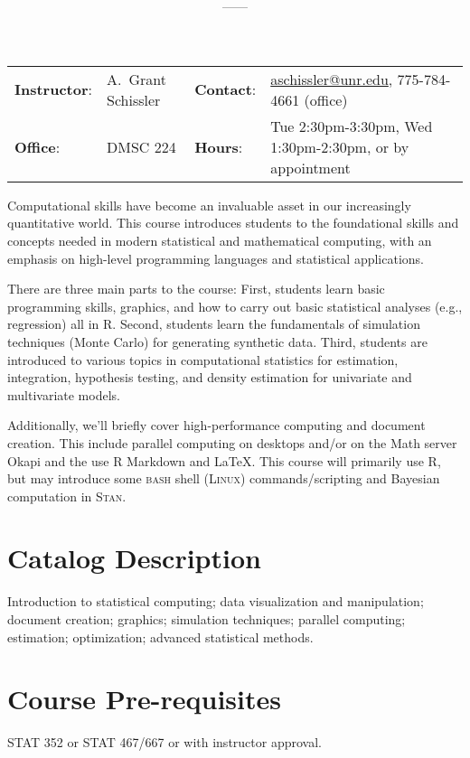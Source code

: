 \documentclass[11pt,onecolumn]{article}
\title{\textbf{\coursename}}
\author{{\semester}---{\roomnumb}---{\classtimes}}
\date{}
\makeatletter
\newcommand{\myname}{A.~Grant Schissler}
\newcommand{\myemail}{aschissler@unr.edu}
\newcommand{\office}{DMSC 224}
\newcommand{\officehours}{Tue 2:30pm-3:30pm, Wed 1:30pm-2:30pm, or by appointment}
\makeatother
\begin{document}
\maketitle

\vspace{-0.25in}
\noindent\makebox[\linewidth]{\rule{\textwidth}{1pt}}

\begin{center}
\begin{tabular}{llll}
\textbf{Instructor}:&\myname & \textbf{Contact}:&\href{mailto:\myemail}{\myemail}, 775-784-4661 (office)\\
\textbf{Office}:&\office & \textbf{Hours}:&\officehours\\
\end{tabular}
\end{center}

Computational skills have become an invaluable asset in our increasingly quantitative world. This course introduces students to the foundational skills and concepts needed in modern statistical and mathematical computing, with an emphasis on high-level programming languages and statistical applications. 

There are three main parts to the course: First, students learn basic programming skills, graphics, and how to carry out basic statistical analyses (e.g., regression) all in \textsc{R}. Second, students learn the fundamentals of simulation techniques (Monte Carlo) for generating synthetic data. Third, students are introduced to various topics in computational statistics for estimation, integration, hypothesis testing, and density estimation for univariate and multivariate models.

Additionally, we'll briefly cover high-performance computing and document creation. This include parallel computing on desktops and/or on the Math server Okapi and the use \textsc{R} Markdown and \LaTeX. This course will primarily use \textsc{R}, but may introduce some \textsc{bash} shell (\textsc{Linux}) commands/scripting and Bayesian computation in \textsc{Stan}.

\section*{Catalog Description}
Introduction to statistical computing; data visualization and manipulation; document creation; graphics; simulation techniques; parallel computing; estimation; optimization; advanced statistical methods.

\section*{Course Pre-requisites}
STAT 352 or STAT 467/667 or with instructor approval.
\end{document}
